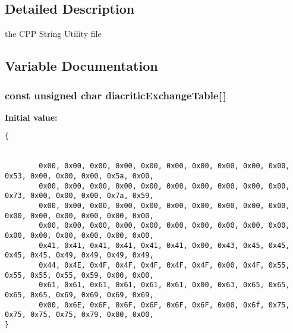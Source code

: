 \subsection{Detailed Description}
the CPP String Utility file 



\subsection{Variable Documentation}
\subsubsection{\setlength{\rightskip}{0pt plus 5cm}const unsigned char diacriticExchangeTable[$\,$]}\label{CPPStringUtils_8cc_f72653d4ea4ec44c18974a29d6991d5e}


\textbf{Initial value:}

\begin{Code}\begin{verbatim}
{
        
    
        0x00, 0x00, 0x00, 0x00, 0x00, 0x00, 0x00, 0x00, 0x00, 0x00, 0x53, 0x00, 0x00, 0x00, 0x5a, 0x00, 
        0x00, 0x00, 0x00, 0x00, 0x00, 0x00, 0x00, 0x00, 0x00, 0x00, 0x73, 0x00, 0x00, 0x00, 0x7a, 0x59, 
        0x00, 0x00, 0x00, 0x00, 0x00, 0x00, 0x00, 0x00, 0x00, 0x00, 0x00, 0x00, 0x00, 0x00, 0x00, 0x00, 
        0x00, 0x00, 0x00, 0x00, 0x00, 0x00, 0x00, 0x00, 0x00, 0x00, 0x00, 0x00, 0x00, 0x00, 0x00, 0x00, 
        0x41, 0x41, 0x41, 0x41, 0x41, 0x41, 0x00, 0x43, 0x45, 0x45, 0x45, 0x45, 0x49, 0x49, 0x49, 0x49, 
        0x44, 0x4E, 0x4F, 0x4F, 0x4F, 0x4F, 0x4F, 0x00, 0x4F, 0x55, 0x55, 0x55, 0x55, 0x59, 0x00, 0x00, 
        0x61, 0x61, 0x61, 0x61, 0x61, 0x61, 0x00, 0x63, 0x65, 0x65, 0x65, 0x65, 0x69, 0x69, 0x69, 0x69, 
        0x00, 0x6E, 0x6F, 0x6F, 0x6F, 0x6F, 0x6F, 0x00, 0x6f, 0x75, 0x75, 0x75, 0x75, 0x79, 0x00, 0x00, 
}
\end{verbatim}
\end{Code}
